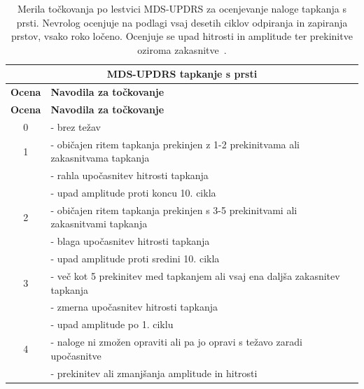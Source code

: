 \documentclass[a4paper,12pt]{article}
\begin{document}
\begin{table}[H]
    \centering
    \renewcommand{\arraystretch}{1.3} %
    \begin{longtable}{|c|p{12cm}|}
        \hline
        \multicolumn{2}{|c|}{\textbf{MDS-UPDRS tapkanje s prsti}} \\
        \hline
        \textbf{Ocena} & \textbf{Navodila za točkovanje} \\
        \hline
        \endfirsthead

        \hline
        \textbf{Ocena} & \textbf{Navodila za točkovanje} \\
        \hline
        \endhead

        0 & - brez težav \\
        \hline
        1 & - običajen ritem tapkanja prekinjen z 1-2 prekinitvama ali zakasnitvama tapkanja \\ 
          & - rahla upočasnitev hitrosti tapkanja \\ 
          & - upad amplitude proti koncu 10. cikla \\
        \hline
        2 & - običajen ritem tapkanja prekinjen s 3-5 prekinitvami ali zakasnitvami tapkanja \\ 
          & - blaga upočasnitev hitrosti tapkanja \\ 
          & - upad amplitude proti sredini 10. cikla \\
        \hline
        3 & - več kot 5 prekinitev med tapkanjem ali vsaj ena daljša zakasnitev tapkanja \\ 
          & - zmerna upočasnitev hitrosti tapkanja \\ 
          & - upad amplitude po 1. ciklu \\
        \hline
        4 & - naloge ni zmožen opraviti ali pa jo opravi s težavo zaradi upočasnitve \\ 
          & - prekinitev ali zmanjšanja amplitude in hitrosti \\
        \hline
    \end{longtable}
    \caption{Merila točkovanja po lestvici MDS-UPDRS za ocenjevanje naloge tapkanja s prsti. Nevrolog ocenjuje na 
    podlagi vsaj desetih ciklov odpiranja in zapiranja prstov, vsako roko ločeno. Ocenjuje se upad hitrosti in 
    amplitude ter prekinitve oziroma zakasnitve~\cite{Stamatakis}.}
    \label{tab:mds_updrs}
\end{table}

\end{document}
